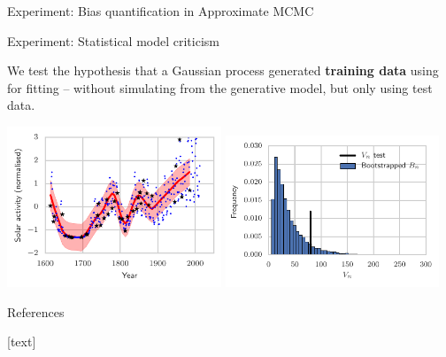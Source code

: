\begin{frame}
\begin{columns}
\begin{column}{.32\linewidth}
\begin{block}{Experiment: Bias quantification in Approximate MCMC}
\begin{minipage}{.35\linewidth}
\end{minipage}
\end{block}
\vspace{-0.75cm}
\begin{block}{Experiment: Statistical model criticism}
\begin{center}
\item We test the hypothesis that a Gaussian process generated \textbf{training data} using for fitting -- without simulating from the generative model, but only using {\color{red} test data}.
\end{center}
\includegraphics[width=0.48\textwidth]{../../presentation/img/gp_regression_data_fit.pdf} \includegraphics[width=0.48\textwidth]{../../presentation/img/gp_regression_bootstrap_hist} 
\begin{minipage}{.35\linewidth}

\end{minipage}
\end{block}
\vspace{-0.75cm}
\begin{block}{References}
\begin{minipage}{.9\linewidth}
{\footnotesize
\begin{multicols}{2}
[text] 
 
\scriptsize
 \ 
\end{multicols}
} 
\end{minipage}
\end{block}

\end{column}
\end{columns}

\end{frame}

